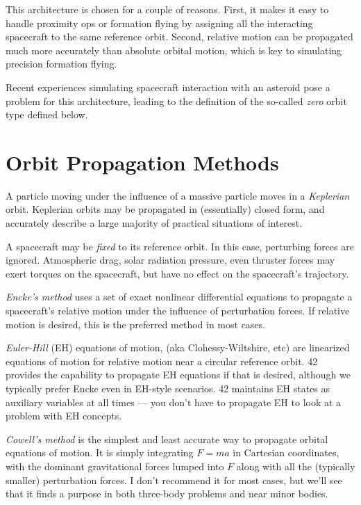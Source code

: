 \documentclass[12pt]{article}
\begin{document}
This architecture is chosen for a couple of reasons.  First, it makes it easy to handle proximity ops or formation flying by assigning all the interacting spacecraft to the same reference orbit.  Second, relative motion can be propagated much more accurately than absolute orbital motion, which is key to simulating precision formation flying.  

Recent experiences simulating spacecraft interaction with an asteroid pose a problem for this architecture, leading to the definition of the so-called {\em zero} orbit type defined below.

\section {Orbit Propagation Methods}

A particle moving under the influence of a massive particle moves in a {\em Keplerian} orbit.  Keplerian orbits may be propagated in (essentially) closed form, and accurately describe a large majority of practical situations of interest.

A spacecraft may be {\em fixed} to its reference orbit.  In this case, perturbing forces are ignored.  Atmospheric drag, solar radiation pressure, even thruster forces may exert torques on the spacecraft, but have no effect on the spacecraft's trajectory.

{\em Encke's method} uses a set of exact nonlinear differential equations to propagate a spacecraft's relative motion under the influence of perturbation forces.  If relative motion is desired, this is the preferred method in most cases.

{\em Euler-Hill} (EH) equations of motion, (aka Clohessy-Wiltshire, etc) are linearized equations of motion for relative motion near a circular reference orbit.  42 provides the capability to propagate EH equations if that is desired, although we typically prefer Encke even in EH-style scenarios.  42 maintains EH states as auxiliary variables at all times --- you don't have to propagate EH to look at a problem with EH concepts. 

{\em Cowell's method} is the simplest and least accurate way to propagate orbital equations of motion.  It is simply integrating $F=ma$ in Cartesian coordinates, with the dominant gravitational forces lumped into $F$ along with all the (typically smaller) perturbation forces.  I don't recommend it for most cases, but we'll see that it finds a purpose in both three-body problems and near minor bodies.
\end{document}
